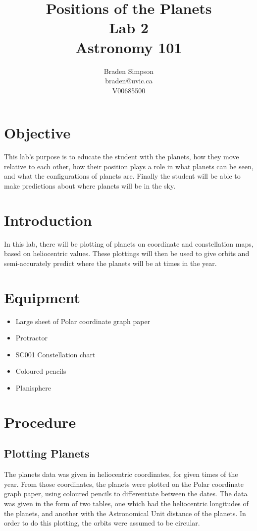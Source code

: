 \documentclass{article}
\begin{document}
\title{Positions of the Planets \\ Lab 2 \\ Astronomy 101}
\author{
Braden Simpson \\ braden@uvic.ca \\ V00685500
}
\maketitle

\section{Objective}
This lab’s purpose is to educate the student with the planets, how they move relative to each other, how their position plays a role in what planets can be seen, and what the configurations of planets are.  Finally the student will be able to make predictions about where planets will be in the sky.
\section{Introduction}
In this lab, there will be plotting of planets on coordinate and constellation maps, based on heliocentric values.  These plottings will then be used to give orbits and semi-accurately predict where the planets will be at times in the year.
\section{Equipment}
\begin{itemize}
\item Large sheet of Polar coordinate graph paper
\item Protractor
\item SC001 Constellation chart
\item Coloured pencils
\item Planisphere
\end{itemize}
\section{Procedure}
\subsection{Plotting Planets}
The planets data was given in heliocentric coordinates, for given times of the year.  From those coordinates, the planets were plotted on the Polar coordinate graph paper, using coloured pencils to differentiate between the dates.  The data was given in the form of two tables, one which had the heliocentric longitudes of the planets, and another with the Astronomical Unit distance of the planets.  In order to do this plotting, the orbits were assumed to be circular. 
\end{document}
